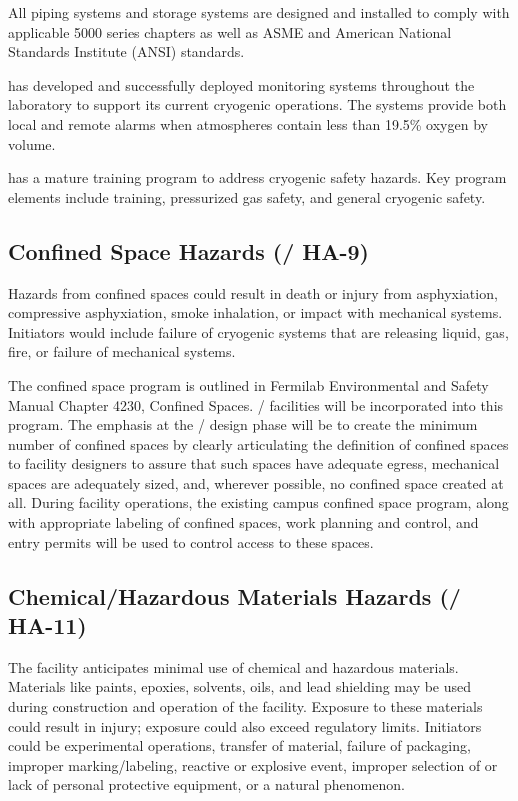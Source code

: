 All piping systems and storage systems are designed and installed to
comply with applicable  5000
series chapters as well as ASME and American National Standards
Institute (ANSI) standards.

\fnal has developed and successfully deployed  monitoring
systems throughout the laboratory to support its current cryogenic
operations. The systems provide both local and remote alarms when
atmospheres contain less than 19.5\% oxygen by volume.

\fnal has a mature training program to address cryogenic safety
hazards. Key program elements include  training,
pressurized gas safety, and general cryogenic safety.


\subsection{Confined Space Hazards (/ HA-9)}

Hazards from confined spaces could result in death or injury from
asphyxiation, compressive asphyxiation, smoke inhalation, or impact
with mechanical systems. Initiators would include failure of cryogenic
systems that are releasing liquid, gas, fire, or failure of mechanical
systems.

The \fnal confined space program is outlined in Fermilab Environmental
and Safety Manual Chapter 4230, Confined
Spaces. / facilities will be incorporated into
this program. The emphasis at the / design
phase will be to create the minimum number of confined spaces by
clearly articulating the definition of confined spaces to facility
designers to assure that such spaces have adequate egress, mechanical
spaces are adequately sized, and, wherever possible, no confined space
created at all. During facility operations, the existing campus
confined space program, along with appropriate labeling of confined
spaces, work planning and control, and entry permits will be used to
control access to these spaces.


\subsection{Chemical/Hazardous Materials Hazards (/ HA-11)}

The  facility anticipates minimal use of chemical and hazardous
materials. Materials like paints, epoxies, solvents, oils, and lead
shielding may be used during construction and operation of the
facility. Exposure to these materials could result in injury; 
exposure could also exceed regulatory limits. Initiators could be
experimental operations, transfer of material, failure of packaging,
improper marking/labeling, reactive or explosive event, improper
selection of or lack of personal protective equipment, or a
natural phenomenon.

